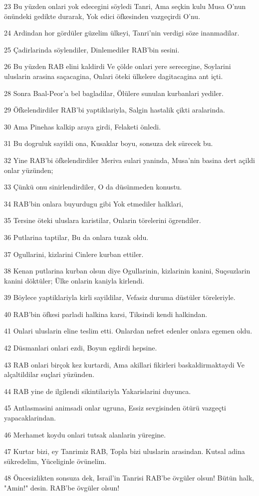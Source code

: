 \par 23 Bu yüzden onlari yok edecegini söyledi Tanri, Ama seçkin kulu Musa O'nun önündeki gedikte durarak, Yok edici öfkesinden vazgeçirdi O'nu.
\par 24 Ardindan hor gördüler güzelim ülkeyi, Tanri'nin verdigi söze inanmadilar.
\par 25 Çadirlarinda söylendiler, Dinlemediler RAB'bin sesini.
\par 26 Bu yüzden RAB elini kaldirdi Ve çölde onlari yere serecegine, Soylarini uluslarin arasina saçacagina, Onlari öteki ülkelere dagitacagina ant içti.
\par 28 Sonra Baal-Peor'a bel bagladilar, Ölülere sunulan kurbanlari yediler.
\par 29 Öfkelendirdiler RAB'bi yaptiklariyla, Salgin hastalik çikti aralarinda.
\par 30 Ama Pinehas kalkip araya girdi, Felaketi önledi.
\par 31 Bu dogruluk sayildi ona, Kusaklar boyu, sonsuza dek sürecek bu.
\par 32 Yine RAB'bi öfkelendirdiler Meriva sulari yaninda, Musa'nin basina dert açildi onlar yüzünden;
\par 33 Çünkü onu sinirlendirdiler, O da düsünmeden konustu.
\par 34 RAB'bin onlara buyurdugu gibi Yok etmediler halklari,
\par 35 Tersine öteki uluslara karistilar, Onlarin törelerini ögrendiler.
\par 36 Putlarina taptilar, Bu da onlara tuzak oldu.
\par 37 Ogullarini, kizlarini Cinlere kurban ettiler.
\par 38 Kenan putlarina kurban olsun diye Ogullarinin, kizlarinin kanini, Suçsuzlarin kanini döktüler; Ülke onlarin kaniyla kirlendi.
\par 39 Böylece yaptiklariyla kirli sayildilar, Vefasiz duruma düstüler töreleriyle.
\par 40 RAB'bin öfkesi parladi halkina karsi, Tiksindi kendi halkindan.
\par 41 Onlari uluslarin eline teslim etti. Onlardan nefret edenler onlara egemen oldu.
\par 42 Düsmanlari onlari ezdi, Boyun egdirdi hepsine.
\par 43 RAB onlari birçok kez kurtardi, Ama akillari fikirleri baskaldirmaktaydi Ve alçaltildilar suçlari yüzünden.
\par 44 RAB yine de ilgilendi sikintilariyla Yakarislarini duyunca.
\par 45 Antlasmasini animsadi onlar ugruna, Essiz sevgisinden ötürü vazgeçti yapacaklarindan.
\par 46 Merhamet koydu onlari tutsak alanlarin yüregine.
\par 47 Kurtar bizi, ey Tanrimiz RAB, Topla bizi uluslarin arasindan. Kutsal adina sükredelim, Yüceliginle övünelim.
\par 48 Öncesizlikten sonsuza dek, Israil'in Tanrisi RAB'be övgüler olsun! Bütün halk, "Amin!" desin. RAB'be övgüler olsun!

